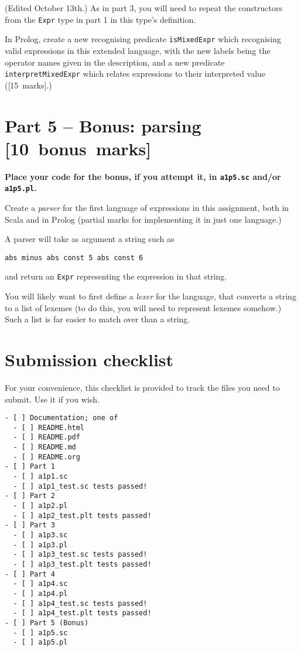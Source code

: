 \documentclass[11pt]{article}
\begin{document}
(Edited October 13th.)
As in part 3, you will need to repeat the constructors from the
\texttt{Expr} type in part 1 in this type's definition.

In Prolog, create a new recognising predicate \texttt{isMixedExpr} which
recognising valid expressions in this extended language,
with the new labels being the operator names given in the description,
and a new predicate \texttt{interpretMixedExpr} which relates
expressions to their interpreted value ([15 marks].)

\section*{Part 5 – Bonus: parsing                [10 bonus marks]}
\label{sec:org54ad894}
\begin{center}
\textbf{Place your code for the bonus, if you attempt it, in \texttt{a1p5.sc} and/or \texttt{a1p5.pl}.}
\end{center}

Create a \emph{parser} for the first language of expressions
in this assignment, both in Scala and in Prolog
(partial marks for implementing it in just one language.)

A parser will take as argument a string such as
\begin{verbatim}
abs minus abs const 5 abs const 6
\end{verbatim}
and return an \texttt{Expr} representing the expression in that string.

You will likely want to first define a \emph{lexer} for the language,
that converts a string to a list of lexemes
(to do this, you will need to represent lexemes somehow.)
Such a list is far easier to match over than a string.

\section*{Submission checklist}
\label{sec:org8f988f1}
For your convenience, this checklist is provided
to track the files you need to submit.
Use it if you wish.
\begin{verbatim}
- [ ] Documentation; one of
  - [ ] README.html
  - [ ] README.pdf
  - [ ] README.md
  - [ ] README.org
- [ ] Part 1
  - [ ] a1p1.sc
  - [ ] a1p1_test.sc tests passed!
- [ ] Part 2
  - [ ] a1p2.pl
  - [ ] a1p2_test.plt tests passed!
- [ ] Part 3
  - [ ] a1p3.sc
  - [ ] a1p3.pl
  - [ ] a1p3_test.sc tests passed!
  - [ ] a1p3_test.plt tests passed!
- [ ] Part 4
  - [ ] a1p4.sc
  - [ ] a1p4.pl
  - [ ] a1p4_test.sc tests passed!
  - [ ] a1p4_test.plt tests passed!
- [ ] Part 5 (Bonus)
  - [ ] a1p5.sc
  - [ ] a1p5.pl
\end{verbatim}
\end{document}
